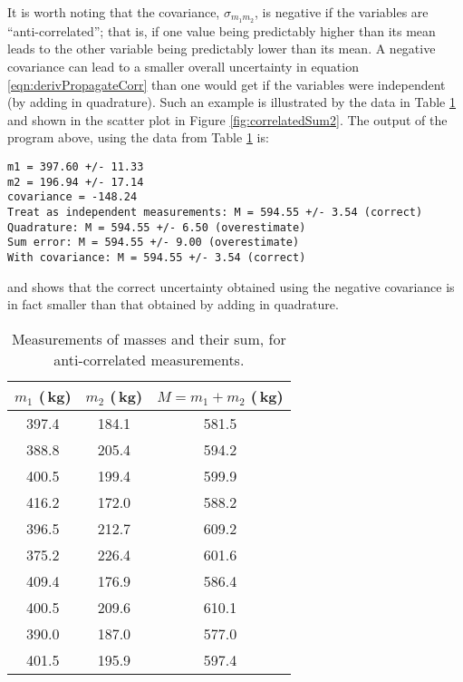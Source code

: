 It is worth noting that the covariance, $\sigma_{m_1m_2}$, is negative if the variables are ``anti-correlated''; that is, if one value being predictably higher than its mean leads to the other variable being predictably lower than its mean. A negative covariance can lead to a smaller overall uncertainty in equation \ref{eqn:derivPropagateCorr} than one would get if the variables were independent (by adding in quadrature). Such an example is illustrated by the data in Table \ref{tab:massSum2} and shown in the scatter plot in Figure \ref{fig:correlatedSum2}. The output of the program above, using the data from Table \ref{tab:massSum2} is:
\begin{verbatim}
m1 = 397.60 +/- 11.33
m2 = 196.94 +/- 17.14
covariance = -148.24
Treat as independent measurements: M = 594.55 +/- 3.54 (correct)
Quadrature: M = 594.55 +/- 6.50 (overestimate)
Sum error: M = 594.55 +/- 9.00 (overestimate)
With covariance: M = 594.55 +/- 3.54 (correct)
\end{verbatim}
and shows that the correct uncertainty obtained using the negative covariance is in fact smaller than that obtained by adding in quadrature.

\begin{table}[h!]
\center
\begin{tabular}{ |c|c|c| }
  \hline
  \textbf{$m_1$ (\,kg)} & \textbf{$m_2$ (\,kg)} & \textbf{$M=m_1+m_2$ (\,kg)}\\
  \hline
397.4 & 184.1 & 581.5\\ 
 \hline
388.8 & 205.4 & 594.2\\ 
 \hline
400.5 & 199.4 & 599.9\\ 
 \hline
416.2 & 172.0 & 588.2\\ 
 \hline
396.5 & 212.7 & 609.2\\ 
 \hline
375.2 & 226.4 & 601.6\\ 
 \hline
409.4 & 176.9 & 586.4\\ 
 \hline
400.5 & 209.6 & 610.1\\ 
 \hline
390.0 & 187.0 & 577.0\\ 
 \hline
401.5 & 195.9 & 597.4\\ 
 \hline
\end{tabular}
\caption{\label{tab:massSum2}Measurements of masses and their sum, for anti-correlated measurements.}
\end{table}


